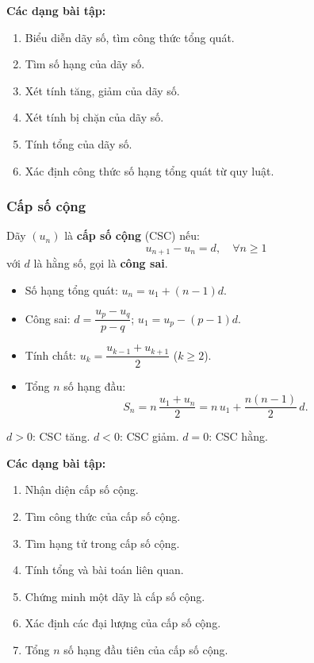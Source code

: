 \documentclass[12pt,a4paper]{article}
\begin{document}
\medskip\noindent\textbf{Các dạng bài tập:}
\begin{enumerate}[label=\textbf{Dạng \arabic*:}, leftmargin=*, align=left]
  \item Biểu diễn dãy số, tìm công thức tổng quát.
  \item Tìm số hạng của dãy số.
  \item Xét tính tăng, giảm của dãy số.
  \item Xét tính bị chặn của dãy số.
  \item Tính tổng của dãy số.
  \item Xác định công thức số hạng tổng quát từ quy luật.
\end{enumerate}

\subsubsection{Cấp số cộng}

\begin{dinhnghia}
  Dãy $(u_n)$ là \textbf{cấp số cộng} (CSC) nếu:
  \[
    u_{n+1} - u_n = d,\quad \forall n \ge 1
  \]
  với $d$ là hằng số, gọi là \textbf{công sai}.
\end{dinhnghia}

\begin{congthuc}
  \begin{itemize}
    \item Số hạng tổng quát: $u_n = u_1 + (n-1)d$.
    \item Công sai: $d = \dfrac{u_p - u_q}{p - q}$; \quad $u_1 = u_p - (p-1)d$.
    \item Tính chất: $u_k = \dfrac{u_{k-1} + u_{k+1}}{2}$ \;($k \ge 2$).
    \item Tổng $n$ số hạng đầu:
      \[
        S_n = n\,\frac{u_1 + u_n}{2}
            = n\,u_1 + \frac{n(n-1)}{2}\,d.
      \]
  \end{itemize}
\end{congthuc}

\begin{luuy}
  $d > 0$: CSC tăng. \quad $d < 0$: CSC giảm. \quad $d = 0$: CSC hằng.
\end{luuy}

\medskip\noindent\textbf{Các dạng bài tập:}
\begin{enumerate}[label=\textbf{Dạng \arabic*:}, leftmargin=*, align=left]
  \item Nhận diện cấp số cộng.
  \item Tìm công thức của cấp số cộng.
  \item Tìm hạng tử trong cấp số cộng.
  \item Tính tổng và bài toán liên quan.
  \item Chứng minh một dãy là cấp số cộng.
  \item Xác định các đại lượng của cấp số cộng.
  \item Tổng $n$ số hạng đầu tiên của cấp số cộng.
\end{enumerate}
\end{document}
